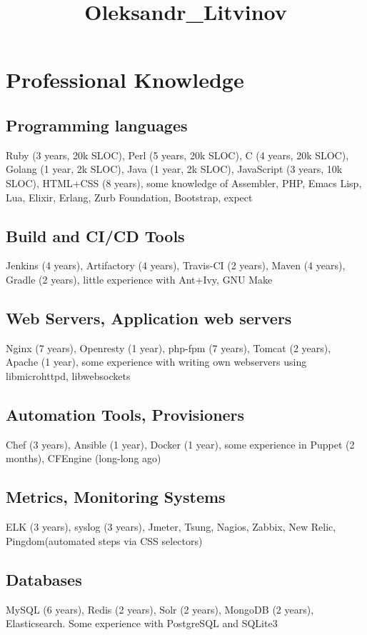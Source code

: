\documentclass[letterpaper]{article}
\date{}
\title{Oleksandr\_Litvinov}
\renewcommand\maketitle{}
\begin{document}
\maketitle
{}

\section{Professional Knowledge}
\label{sec-1}
\subsection{Programming languages}
\label{sec-1-1}
Ruby (3 years, 20k SLOC),
Perl (5 years, 20k SLOC),
C (4 years, 20k SLOC),
Golang (1 year, 2k SLOC),
Java (1 year, 2k SLOC),
JavaScript (3 years, 10k SLOC),
HTML+CSS (8 years),
some knowledge of Assembler, PHP, Emacs Lisp, Lua, Elixir, Erlang, Zurb Foundation, Bootstrap, expect
\subsection{Build and CI/CD Tools}
\label{sec-1-2}
Jenkins (4 years),
Artifactory (4 years),
Travis-CI (2 years),
Maven (4 years),
Gradle (2 years),
little experience with Ant+Ivy, GNU Make
\subsection{Web Servers, Application web servers}
\label{sec-1-3}
Nginx (7 years),
Openresty (1 year),
php-fpm (7 years),
Tomcat (2 years),
Apache (1 year),
some experience with writing own webservers using libmicrohttpd, libwebsockets
\subsection{Automation Tools, Provisioners}
\label{sec-1-4}
Chef (3 years),
Ansible (1 year),
Docker (1 year),
some experience in Puppet (2 months), CFEngine (long-long ago)
\subsection{Metrics, Monitoring Systems}
\label{sec-1-5}
ELK (3 years),
syslog (3 years),
Jmeter,
Tsung,
Nagios,
Zabbix,
New Relic,
Pingdom(automated steps via CSS selectors)
\subsection{Databases}
\label{sec-1-6}
MySQL (6 years),
Redis (2 years),
Solr (2 years),
MongoDB (2 years),
Elasticsearch.
Some experience with PostgreSQL and SQLite3
\end{document}

